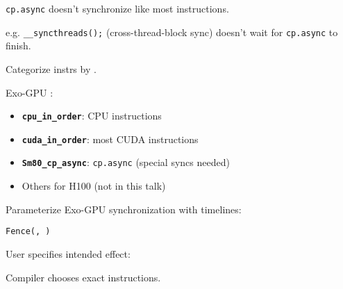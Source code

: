 \newpage
{}

{\LARGE
\texttt{cp.async} doesn't synchronize like most instructions.

e.g. \texttt{\_\_syncthreads();} (cross-thread-block sync) doesn't wait for \texttt{cp.async} to finish.

}
\vfill

\begin{center}
\Large
\begin{tikzpicture}[node distance=0mm]

\end{tikzpicture}
\end{center}

\newpage
{}

{\LARGE
Categorize instrs by .

Exo-GPU :
\begin{itemize}
  \item \textbf{\texttt{cpu\_in\_order}}: CPU instructions
  \item \textbf{\texttt{cuda\_in\_order}}: most CUDA instructions
  \item \textbf{\texttt{Sm80\_cp\_async}}: \texttt{cp.async} (special syncs needed)
  \item Others for H100 (not in this talk)
\end{itemize}

}

\newpage
{}

{\LARGE
Parameterize Exo-GPU synchronization with timelines:

\begin{center}
  \texttt{Fence(, )}
\end{center}

User specifies intended effect:

\begin{center}
\end{center}

Compiler chooses exact instructions.


}

